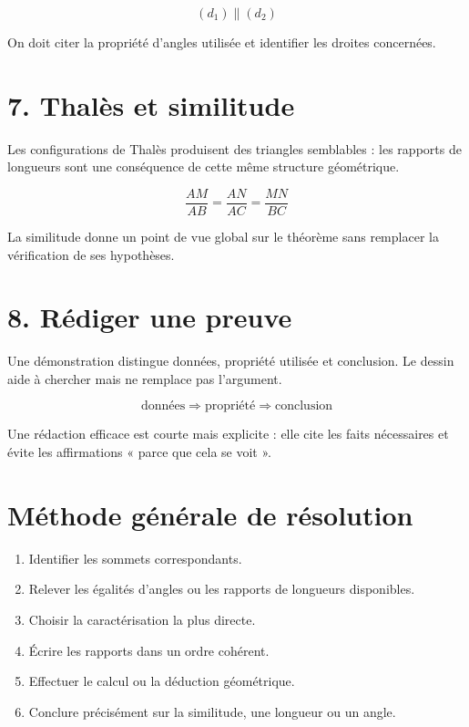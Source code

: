 \[
(d_1)\parallel(d_2)
\]

\begin{exemple}
On doit citer la propriété d’angles utilisée et identifier les droites concernées.
\end{exemple}

\section{7. Thalès et similitude}
Les configurations de Thalès produisent des triangles semblables : les rapports de longueurs sont une conséquence de cette même structure géométrique.

\[
\dfrac{AM}{AB}=\dfrac{AN}{AC}=\dfrac{MN}{BC}
\]

\begin{exemple}
La similitude donne un point de vue global sur le théorème sans remplacer la vérification de ses hypothèses.
\end{exemple}

\section{8. Rédiger une preuve}
Une démonstration distingue données, propriété utilisée et conclusion. Le dessin aide à chercher mais ne remplace pas l’argument.

\[
\text{données}\Rightarrow\text{propriété}\Rightarrow\text{conclusion}
\]

\begin{exemple}
Une rédaction efficace est courte mais explicite : elle cite les faits nécessaires et évite les affirmations « parce que cela se voit ».
\end{exemple}

\section{Méthode générale de résolution}
\begin{methode}
\begin{enumerate}
\item Identifier les sommets correspondants.
\item Relever les égalités d’angles ou les rapports de longueurs disponibles.
\item Choisir la caractérisation la plus directe.
\item Écrire les rapports dans un ordre cohérent.
\item Effectuer le calcul ou la déduction géométrique.
\item Conclure précisément sur la similitude, une longueur ou un angle.
\end{enumerate}
\end{methode}

